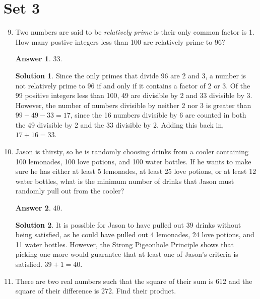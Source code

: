 \documentclass[11pt]{article}
\theoremstyle{definition}
\newtheorem*{solution}{Solution}
\newtheorem*{answer}{Answer}
\begin{document}
\section*{Set 3}
\begin{enumerate}
\setcounter{enumi}{8}

\item Two numbers are said to be \emph{relatively prime} is their only common factor is 1. How many postive integers less than 100 are relatively prime to 96? %

\begin{answer}
33.
\end{answer}
\begin{solution} Since the only primes that divide 96 are 2 and 3, a number is not relatively prime to 96 if and only if it contains a factor of 2 or 3. Of the 99 positive integers less than 100, 49 are divisible by 2 and 33 divisible by 3. However, the number of numbers divisible by neither 2 nor 3 is greater than $99 - 49 - 33 = 17$, since the 16 numbers divisible by 6 are counted in both the 49 divisible by 2 and the 33 divisible by 2. Adding this back in, $17 + 16 = \boxed{33}$.

\end{solution}

\item Jason is thirsty, so he is randomly choosing drinks from a cooler containing 100 lemonades, 100 love potions, and 100 water bottles. If he wants to make sure he has either at least 5 lemonades, at least 25 love potions, or at least 12 water bottles, what is the minimum number of drinks that Jason must randomly pull out from the cooler?

\begin{answer}
40.
\end{answer}
\begin{solution} It is possible for Jason to have pulled out 39 drinks without being satisfied, as he could have pulled out 4 lemonades, 24 love potions, and 11 water bottles. However, the Strong Pigeonhole Principle shows that picking one more would guarantee that at least one of Jason's criteria is satisfied. $39 + 1 = \boxed{40}$.

\end{solution}

\item There are two real numbers such that the square of their sum is 612 and the square of their difference is 272. Find their product.


\end{enumerate}
\end{document}
